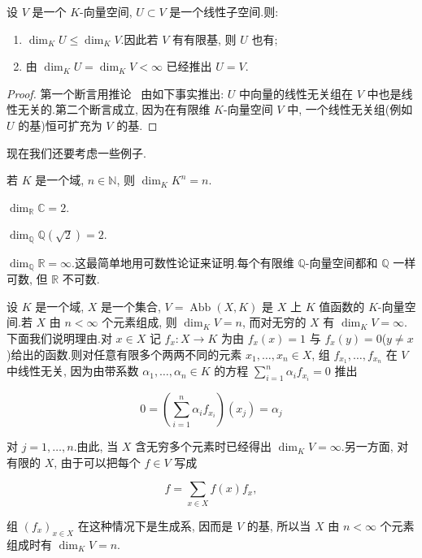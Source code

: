 \begin{corollary}[子空间的维数]\label{cor:1.5.14}
设 $V$ 是一个 $K$-向量空间, $U \subset V$ 是一个线性子空间.则:
\begin{enumerate}
\item[(i)] $\dim_K U \leq \dim_K V$.因此若 $V$ 有有限基, 则 $U$ 也有;
\item[(ii)] 由 $\dim_K U = \dim_K V < \infty$ 已经推出 $U = V$.
\end{enumerate}
\end{corollary}

\begin{proof}
第一个断言用推论~ 由如下事实推出: $U$ 中向量的线性无关组在 $V$ 中也是线性无关的.第二个断言成立, 因为在有限维 $K$-向量空间 $V$ 中, 一个线性无关组(例如 $U$ 的基)恒可扩充为 $V$ 的基.
\end{proof}

现在我们还要考虑一些例子.

\begin{bsp}\label{bsp:1.5.1}
若 $K$ 是一个域, $n \in \mathbb{N}$, 则 $\dim_K K^n = n$.
\end{bsp}

\begin{bsp}\label{bsp:1.5.2}
$\dim_{\mathbb{R}} \mathbb{C} = 2$.
\end{bsp}

\begin{bsp}\label{bsp:1.5.3}
$\dim_{\mathbb{Q}} \mathbb{Q}(\sqrt{2}) = 2$.
\end{bsp}

\begin{bsp}\label{bsp:1.5.4}
$\dim_{\mathbb{Q}} \mathbb{R} = \infty$.这最简单地用可数性论证来证明.每个有限维 $\mathbb{Q}$-向量空间都和 $\mathbb{Q}$ 一样可数, 但 $\mathbb{R}$ 不可数.
\end{bsp}

\begin{bsp}\label{bsp:1.5.5}
设 $K$ 是一个域, $X$ 是一个集合, $V = \operatorname{Abb}(X, K)$ 是 $X$ 上 $K$ 值函数的 $K$-向量空间.若 $X$ 由 $n < \infty$ 个元素组成, 则 $\dim_K V = n$, 而对无穷的 $X$ 有 $\dim_K V = \infty$.下面我们说明理由.对 $x \in X$ 记 $f_x \colon X \longrightarrow K$ 为由 $f_x(x) = 1$ 与 $f_x(y) = 0$($y \neq x$)给出的函数.则对任意有限多个两两不同的元素 $x_1, \ldots, x_n \in X$, 组 $f_{x_1}, \ldots, f_{x_n}$ 在 $V$ 中线性无关, 因为由带系数 $\alpha_1, \ldots, \alpha_n \in K$ 的方程 $\sum_{i = 1}^{n} \alpha_i f_{x_i} = 0$ 推出

\[
0 = \left(\sum_{i = 1}^{n} \alpha_i f_{x_i}\right)(x_j) = \alpha_j
\]

对 $j = 1, \ldots, n$.由此, 当 $X$ 含无穷多个元素时已经得出 $\dim_K V = \infty$.另一方面, 对有限的 $X$, 由于可以把每个 $f \in V$ 写成

\[
f = \sum_{x \in X} f(x) f_x,
\]

组 $(f_x)_{x \in X}$ 在这种情况下是生成系, 因而是 $V$ 的基, 所以当 $X$ 由 $n < \infty$ 个元素组成时有 $\dim_K V = n$.
\end{bsp}

